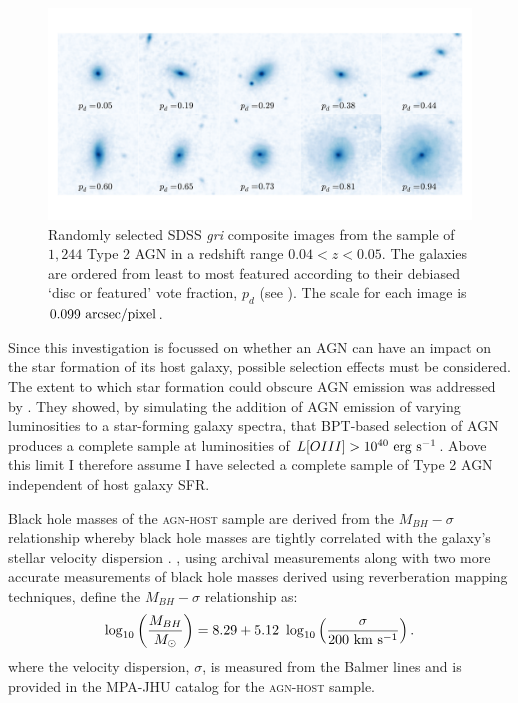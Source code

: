 \begin{figure}
\includegraphics[width=\textwidth]{agn/fig1.pdf}
\caption[SDSS images of galaxies in the \textsc{agn-host} sample]{Randomly selected SDSS \emph{gri} composite images from the sample of $1,244$ Type 2 AGN in a redshift range $0.04 < z < 0.05$.  The galaxies are ordered from least to most featured according to their debiased `disc or featured' vote fraction, $p_d$ (see \citealt{GZ2}). The scale for each image is $0.099~\rm{arcsec/pixel}$.}
\label{mosaic}
\end{figure}

Since this investigation is focussed on whether an AGN can have an impact on the star formation of its host galaxy, possible selection effects must be considered. The extent to which star formation could obscure AGN emission was addressed by \cite{schawinski10a}. They showed, by simulating the addition of AGN emission of varying luminosities to a star-forming galaxy spectra, that BPT-based selection of AGN produces a complete sample at luminosities of $L[OIII] > 10^{40}~\rm{erg~s}^{-1}$. Above this limit I therefore assume I have selected a complete sample of Type 2 AGN independent of host galaxy SFR. 

Black hole masses of the \textsc{agn-host} sample are derived from the $M_{BH}-\sigma$ relationship whereby black hole masses are tightly correlated with the galaxy's stellar velocity dispersion \citep{magorrian98, marconi03, haringrix04}. \citet{mcconnell11}, using archival measurements along with two more accurate measurements of black hole masses derived using reverberation mapping techniques, define the $M_{BH}-\sigma$ relationship as:
\begin{equation}
\log_{10}\left(\frac{M_{BH}}{M_{\odot}}\right) = 8.29 + 5.12 ~\log_{10}\left(\frac{\sigma}{200 ~\rm{km} ~s^{-1}}\right). 
\end{equation}
where the velocity dispersion, $\sigma$, is measured from the Balmer lines and is provided in the MPA-JHU catalog \citep{kauffmann03, brinchmann04} for the \textsc{agn-host} sample.

